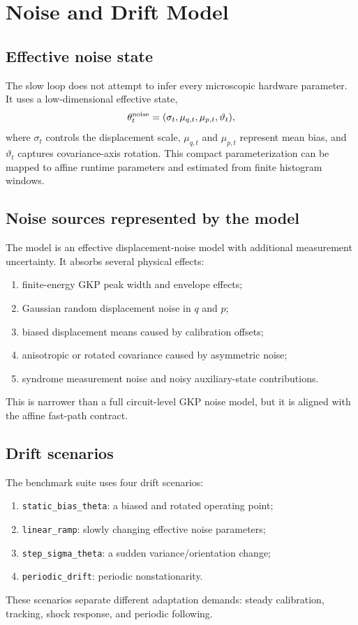 \documentclass[11pt]{article}
\begin{document}
\section{Noise and Drift Model}

\subsection{Effective noise state}

The slow loop does not attempt to infer every microscopic hardware parameter.
It uses a low-dimensional effective state,
\begin{equation}
    \theta_t^{\rm noise}
    =
    (\sigma_t,\mu_{q,t},\mu_{p,t},\vartheta_t),
\end{equation}
where \(\sigma_t\) controls the displacement scale, \(\mu_{q,t}\) and
\(\mu_{p,t}\) represent mean bias, and \(\vartheta_t\) captures covariance-axis
rotation.  This compact parameterization can be mapped to affine runtime
parameters and estimated from finite histogram windows.

\subsection{Noise sources represented by the model}

The model is an effective displacement-noise model with additional measurement
uncertainty.  It absorbs several physical effects:
\begin{enumerate}
    \item finite-energy GKP peak width and envelope effects;
    \item Gaussian random displacement noise in \(q\) and \(p\);
    \item biased displacement means caused by calibration offsets;
    \item anisotropic or rotated covariance caused by asymmetric noise;
    \item syndrome measurement noise and noisy auxiliary-state contributions.
\end{enumerate}
This is narrower than a full circuit-level GKP noise model, but it is aligned
with the affine fast-path contract.

\subsection{Drift scenarios}

The benchmark suite uses four drift scenarios:
\begin{enumerate}
    \item \texttt{static\_bias\_theta}: a biased and rotated operating point;
    \item \texttt{linear\_ramp}: slowly changing effective noise parameters;
    \item \texttt{step\_sigma\_theta}: a sudden variance/orientation change;
    \item \texttt{periodic\_drift}: periodic nonstationarity.
\end{enumerate}
These scenarios separate different adaptation demands: steady calibration,
tracking, shock response, and periodic following.
\end{document}
